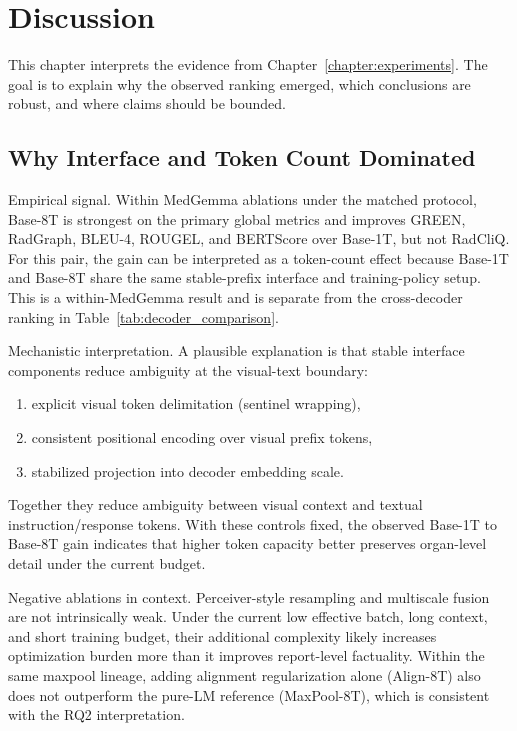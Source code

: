 \chapter{Discussion}\label{chapter:discussion}

This chapter interprets the evidence from Chapter~\ref{chapter:experiments}. The goal is to explain why the observed ranking emerged, which conclusions are robust, and where claims should be bounded.

\section{Why Interface and Token Count Dominated}
Empirical signal. Within MedGemma ablations under the matched protocol, Base-8T is strongest on the primary global metrics and improves \ac{GREEN}, \ac{RadGraph}, BLEU-4, \ac{ROUGEL}, and \ac{BERTScore} over Base-1T, but not \ac{RadCliQ}.
For this pair, the gain can be interpreted as a token-count effect because Base-1T and Base-8T share the same stable-prefix interface and training-policy setup. This is a within-MedGemma result and is separate from the cross-decoder ranking in Table~\ref{tab:decoder_comparison}.

Mechanistic interpretation. A plausible explanation is that stable interface components reduce ambiguity at the visual-text boundary:
\begin{enumerate}
    \item explicit visual token delimitation (sentinel wrapping),
    \item consistent positional encoding over visual prefix tokens,
    \item stabilized projection into decoder embedding scale.
\end{enumerate}
Together they reduce ambiguity between visual context and textual instruction/response tokens. With these controls fixed, the observed Base-1T to Base-8T gain indicates that higher token capacity better preserves organ-level detail under the current budget.

Negative ablations in context. Perceiver-style resampling and multiscale fusion are not intrinsically weak. Under the current low effective batch, long context, and short training budget, their additional complexity likely increases optimization burden more than it improves report-level factuality.
Within the same maxpool lineage, adding alignment regularization alone (Align-8T) also does not outperform the pure-LM reference (MaxPool-8T), which is consistent with the RQ2 interpretation.

